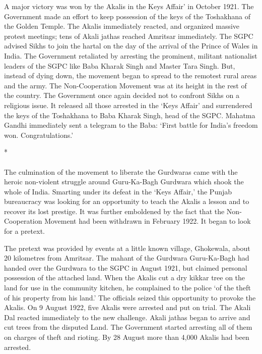 A major victory was won by the Akalis in the Keys Affair' in October 1921. The Government made an effort to keep possession of the keys of the Toshakhana of the Golden Temple. The Akalis immediately reacted, and organized massive protest meetings; tens of Akali jathas reached Amritsar immediately. The SGPC advised Sikhs to join the hartal on the day of the arrival of the Prince of Wales in India. The Government retaliated by arresting the prominent, militant nationalist leaders of the SGPC like Baba Kharak Singh and Master Tara Singh. But, instead of dying down, the movement began to spread to the remotest rural areas and the army. The Non-Cooperation Movement was at its height in the rest of the country. The Government once again decided not to confront Sikhs on a religious issue. It released all those arrested in the `Keys Affair' and surrendered the keys of the Toshakhana to Baba Kharak Singh, head of the SGPC. Mahatma Gandhi immediately sent a telegram to the Baba: `First battle for India's freedom won. Congratulations.'

\begin{center}*\end{center}

\paragraph*{}

The culmination of the movement to liberate the Gurdwaras came with the heroic non-violent struggle around Guru-Ka-Bagh Gurdwara which shook the whole of India. Smarting under its defeat in the `Keys Affair,' the Punjab bureaucracy was looking for an opportunity to teach the Akalis a lesson and to recover its lost prestige. It was further emboldened by the fact that the Non- Cooperation Movement had been withdrawn in February 1922. It began to look for a pretext.

The pretext was provided by events at a little known village, Ghokewala, about 20 kilometres from Amritsar. The mahant of the Gurdwara Guru-Ka-Bagh had handed over the Gurdwara to the SGPC in August 1921, but claimed personal possession of the attached land. When the Akalis cut a dry kikkar tree on the land for use in the community kitchen, he complained to the police `of the theft of his property from his land.' The officials seized this opportunity to provoke the Akalis. On 9 August 1922, five Akalis were arrested and put on trial. The Akali Dal reacted immediately to the new challenge. Akali jathas began to arrive and cut trees from the disputed Land. The Government started arresting all of them on charges of theft and rioting. By 28 August more than 4,000 Akalis had been arrested.

